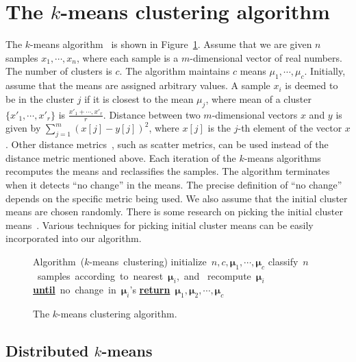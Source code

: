 
\section{The $k$-means clustering algorithm}
\label{sec:k-means}

The $k$-means algorithm~\cite{pattern-classification,Llyod-82} is
shown in Figure~\ref{fig:k-means}. Assume that we are given $n$
samples $x_1,\cdots,x_n$, where each sample is a $m$-dimensional
vector of real numbers. The number of clusters is $c$. The algorithm
maintains $c$ means $\mu_1,\cdots,\mu_c$. Initially, assume that the
means are assigned arbitrary values. A sample $x_i$ is deemed to be in
the cluster $j$ if it is closest to the mean $\mu_j$, where mean of a
cluster $\{x'_1,\cdots,x'_r \}$ is
$\frac{x'_1+\cdots,x'_r}{r}$. Distance between two $m$-dimensional
vectors $x$ and $y$ is given by $\sum_{j=1}^m (x[j] - y[j])^2$, where
$x[j]$ is the $j$-th element of the vector $x$.  Other distance
metrics~\cite[Chapter 10]{pattern-classification}, such as scatter
metrics, can be used instead of the distance metric mentioned above.
Each iteration of the $k$-means algorithms recomputes the means and
reclassifies the samples. The algorithm terminates when it detects
``no change'' in the means. The precise definition of ``no change''
depends on the specific metric being used. We also assume that the
initial cluster means are chosen randomly. There is some research on
picking the initial cluster means~\cite{Initial:kmeans}. Various
techniques for picking initial cluster means can be easily
incorporated into our algorithm.

\begin{figure}
\begin{center}
\begin{programbox}
\mbox{Algorithm ($k$-means clustering)}
\BEGIN \mbox{initialize $n,c,\mathbf{\mu}_1,\cdots,\mathbf{\mu}_c$}
	\DO \mbox{classify $n$ samples according to nearest $\mathbf{\mu}_i$, and }
	    \mbox{recompute $\mathbf{\mu}_i$}
	\mbox{{\bf \underline{until}} no change in $\mathbf{\mu}_i$'s}
 \mbox{{\bf \underline{return}} $\mathbf{\mu}_1,\mathbf{\mu}_2,\cdots,\mathbf{\mu}_c$}
\END
\end{programbox}
\end{center}
\caption{The $k$-means clustering algorithm.}
\label{fig:k-means}
\end{figure}

\subsection{Distributed $k$-means}


